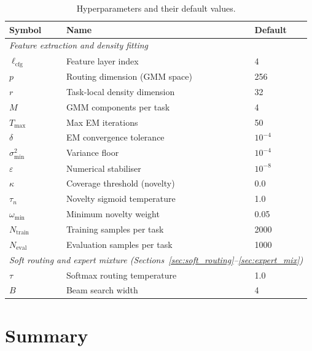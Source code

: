 \documentclass[12pt,a4paper]{article}
\begin{document}
\begin{table}[h]
\centering
\caption{Hyperparameters and their default values.}
\label{tab:hyperparams}
\begin{tabular}{lll}
\toprule
Symbol & Name & Default \\
\midrule
\multicolumn{3}{l}{\textit{Feature extraction and density fitting}} \\
\midrule
$\ell_{\mathrm{cfg}}$ & Feature layer index & 4 \\
$p$ & Routing dimension (GMM space) & 256 \\
$r$ & Task-local density dimension & 32 \\
$M$ & GMM components per task & 4 \\
$T_{\max}$ & Max EM iterations & 50 \\
$\delta$ & EM convergence tolerance & $10^{-4}$ \\
$\sigma^2_{\min}$ & Variance floor & $10^{-4}$ \\
$\varepsilon$ & Numerical stabiliser & $10^{-8}$ \\
$\kappa$ & Coverage threshold (novelty) & 0.0 \\
$\tau_n$ & Novelty sigmoid temperature & 1.0 \\
$\omega_{\min}$ & Minimum novelty weight & 0.05 \\
$N_{\mathrm{train}}$ & Training samples per task & 2000 \\
$N_{\mathrm{eval}}$ & Evaluation samples per task & 1000 \\
\midrule
\multicolumn{3}{l}{\textit{Soft routing and expert mixture (Sections~\ref{sec:soft_routing}--\ref{sec:expert_mix})}} \\
\midrule
$\tau$ & Softmax routing temperature & 1.0 \\
$B$ & Beam search width & 4 \\
\bottomrule
\end{tabular}
\end{table}

\section{Summary}
\label{sec:summary}
\end{document}

